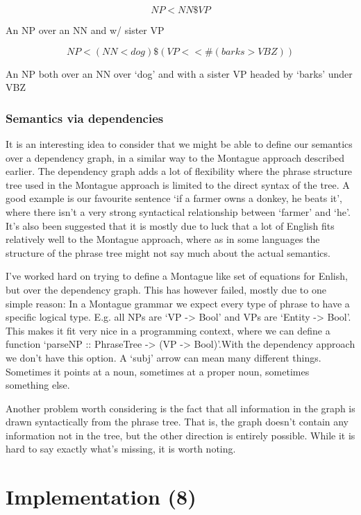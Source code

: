 \documentclass[12pt]{article}
\let\stdsection\section
\renewcommand\section{\newpage\stdsection}
\begin{document}
\begin{equation}
NP < NN \$ VP
\end{equation}

An NP over an NN and w/ sister VP

\begin{equation}
NP < (NN < dog) \$ (VP <<\# (barks > VBZ))
\end{equation}

An NP both over an NN over `dog' and with
a sister VP headed by `barks' under VBZ

\subsubsection{Semantics via dependencies}
It is an interesting idea to consider that we might be able to define our semantics over a dependency graph, in a similar way to the Montague approach described earlier. The dependency graph adds a lot of flexibility where the phrase structure tree used in the Montague approach is limited to the direct syntax of the tree. A good example is our favourite sentence `if a farmer owns a donkey, he beats it', where there isn't a very strong syntactical relationship between `farmer' and `he'. It's also been suggested that it is mostly due to luck that a lot of English fits relatively well to the Montague approach, where as in some languages the structure of the phrase tree might not say much about the actual semantics.

I've worked hard on trying to define a Montague like set of equations for Enlish, but over the dependency graph. This has however failed, mostly due to one simple reason: In a Montague grammar we expect every type of phrase to have a specific logical type. E.g. all NPs are `VP -> Bool' and VPs are `Entity -> Bool'. This makes it fit very nice in a programming context, where we can define a function `parseNP :: PhraseTree -> (VP -> Bool)'.With the dependency approach we don't have this option. A `subj' arrow can mean many different things. Sometimes it points at a noun, sometimes at a proper noun, sometimes something else.

Another problem worth considering is the fact that all information in the graph is drawn syntactically from the phrase tree. That is, the graph doesn't contain any information not in the tree, but the other direction is entirely possible. While it is hard to say exactly what's missing, it is worth noting.

\section{Implementation (8)}
\end{document}
